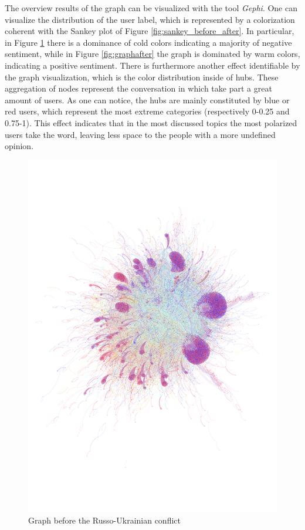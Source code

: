 \documentclass[sigchi]{acmart}
\begin{document}
The overview results of the graph can be visualized with the tool \textit{Gephi}. One can visualize the distribution of the user label, which is represented by a colorization coherent with the Sankey plot of Figure \ref{fig:sankey_before_after}. In particular, in Figure \ref{fig:graphbefore} there is a dominance of cold colors indicating a majority of negative sentiment, while in Figure \ref{fig:graphafter} the graph is dominated by warm colors, indicating a positive sentiment. There is furthermore another effect identifiable by the graph visualization, which is the color distribution inside of hubs. These aggregation of nodes represent the conversation in which take part a great amount of users. As one can notice, the hubs are mainly constituted by blue or red users, which represent the most extreme categories (respectively 0-0.25 and 0.75-1). This effect indicates that in the most discussed topics the most polarized users take the word, leaving less space to the people with a more undefined opinion.

\begin{figure}[h]
  \centering
  \includegraphics[width=0.88\columnwidth]{report/img/graph_before_sparso.pdf}
  \caption{Graph before the Russo-Ukrainian conflict}
  \label{fig:graphbefore}
\end{figure}%
\end{document}

